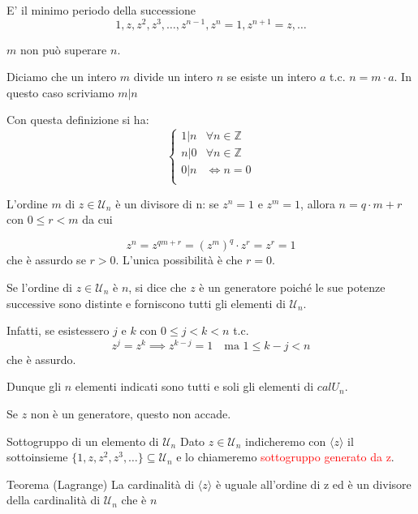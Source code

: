 \documentclass[11pt]{article}
\newcommand{\calU}{\mathcal{U}}
\begin{document}
    E' il minimo periodo della successione
    $$1, z, z^2, z^3, \dots, z^{n-1}, z^n = 1, z^{n+1} = z, \dots$$

    $m$ non può superare $n$.

    \begin{definition}{}{}
        Diciamo che un intero $m$ divide un intero $n$ se esiste un intero $a$ t.c. $n = m \cdot a$.
        In questo caso scriviamo $m | n$
    \end{definition}

    \begin{example}{}{}
        Con questa definizione si ha:
        $$
        \begin{cases}
            1 | n & \forall n \in \mathbb{Z} \\
            n | 0 & \forall n \in \mathbb{Z} \\
            0 | n & \iff n = 0 \\
        \end{cases}
        $$
    \end{example}
    

    L'ordine $m$ di $z \in \calU_n$ è un divisore di n: se $z^n=1$ e $z^m=1$, allora $n = q \cdot m + r$ con $0 \leq r < m$ da cui

    $$z^n = z^{qm+r} = (z^m)^q \cdot z^r = z^r = 1$$
    che è assurdo se $r>0$. L'unica possibilità è che $r=0$.

    Se l'ordine di $z\in \calU_n$ è $n$, si dice che $z$ è un generatore poiché le sue potenze successive sono distinte e forniscono tutti gli elementi di $\calU_n$.

    Infatti, se esistessero $j$ e $k$ con $0 \leq j < k < n$ t.c.
    $$z^j = z^k \implies z^{k-j}=1 \quad \text{ma } 1 \leq k-j < n$$
    che è assurdo.

    Dunque gli $n$ elementi indicati sono tutti e soli gli elementi di $calU_n$.

    Se $z$ non è un generatore, questo non accade.

        \begin{definition}{Sottogruppo di un elemento di $\calU_n$}{}
            Dato $z \in \calU_n$ indicheremo con $\langle z \rangle$ il sottoinsieme $\{1, z, z^2, z^3, \dots \} \subseteq \calU_n$ e lo chiameremo \textcolor{red}{sottogruppo generato da z}.
        \end{definition}

        \begin{theorem}{Teorema (Lagrange)}{}
            La cardinalità di $\langle z \rangle$ è uguale all'ordine di z ed è un divisore della cardinalità di $\calU_n$ che è $n$
        \end{theorem}
\end{document}
